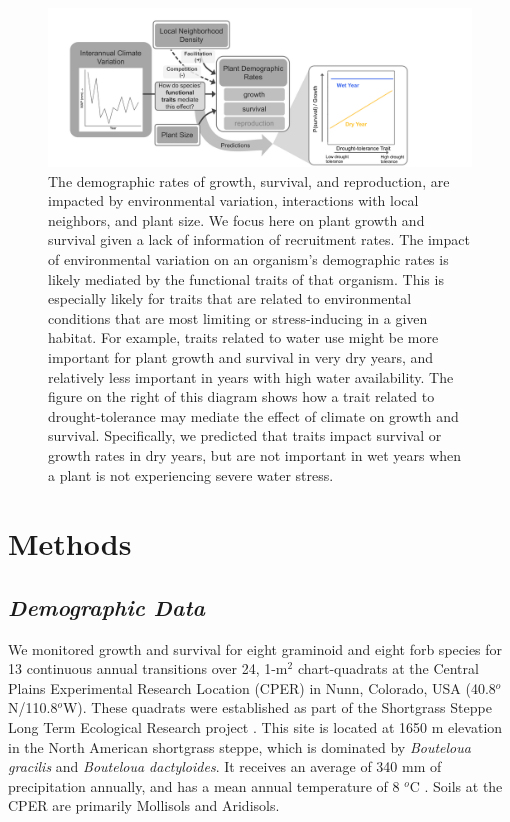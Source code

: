 \documentclass[12pt, letterpaper]{article}
\begin{document}
\begin{figure}
\includegraphics[width=1\textwidth]{CO_sgs_ConceptualFigure.pdf}
\caption{\small{
The demographic rates of growth, survival, and reproduction, are impacted by environmental variation, interactions with local neighbors, and plant size. We focus here on plant growth and survival given a lack of information of recruitment rates. The impact of environmental variation on an organism's demographic rates is likely mediated by the functional traits of that organism. This is especially likely for traits that are related to environmental conditions that are most limiting or stress-inducing in a given habitat. For example, traits related to water use might be more important for plant growth and survival in very dry years, and relatively less important in years with high water availability. The figure on the right of this diagram shows how a trait related to drought-tolerance may mediate the effect of climate on growth and survival. Specifically, we predicted that traits impact survival or growth rates in dry years, but are not important in wet years when a plant is not experiencing severe water stress. 
}}
\label{fig:ConceptFig}
\end{figure}

\section{Methods}
\subsection{\textit{Demographic Data}} We monitored growth and survival for eight graminoid and eight forb species for 13 continuous annual transitions over 24, 1-m$^2$ chart-quadrats at the Central Plains Experimental Research Location (CPER) in Nunn, Colorado, USA (40.8$^o$N/110.8$^o$W). These quadrats were established as part of the Shortgrass Steppe Long Term Ecological Research project
\citep{Chu2013}. This site is located at 1650 m elevation in the North American shortgrass steppe, which is dominated by \textit{Bouteloua gracilis} and \textit{Bouteloua dactyloides}. It receives an average of 340 mm of precipitation annually, and has a mean annual temperature of 8 $^o$C \citep{Chu2014}. Soils at the CPER are primarily Mollisols and Aridisols.
\end{document}
